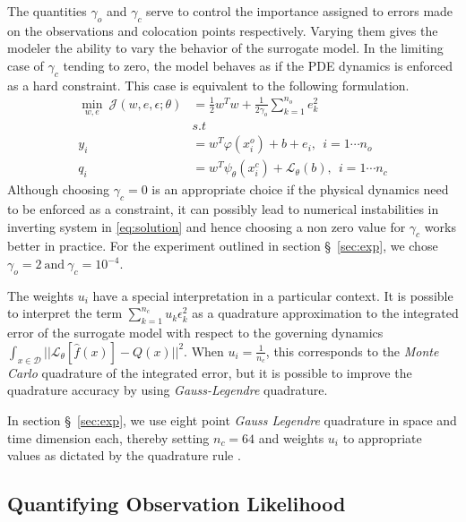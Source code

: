 The quantities $\gamma_o$ and $\gamma_c$ serve to control the importance assigned to errors made 
on the observations and colocation points respectively. Varying them gives the modeler the ability 
to vary the behavior of the surrogate model. In the limiting case of $\gamma_c$ tending to zero, 
the model behaves as if the PDE dynamics is enforced as a hard constraint. This case is equivalent 
to the following formulation.
%
\begin{equation}\label{eq:surrogate2}
   \begin{aligned}
    \min_{w,e} \ \mathcal{J}(w,e,\epsilon;\theta) &= 
    \frac{1}{2} w^{T}w + \frac{1}{2\gamma_{o}} \sum_{k = 1}^{n_{o}}{e^{2}_{k}} \\
    & s.t \\
    y_{i} & = w^{T}\varphi(x^{o}_{i}) + b + e_{i}, \ \ i = 1 \cdots n_{o} \\
    q_{i} & = w^{T}\psi_{\theta}(x^{c}_{i}) + \mathcal{L}_{\theta}(b), \ \ i = 1 \cdots n_{c}
   \end{aligned}
\end{equation}
%
Although choosing $\gamma_c = 0$ is an appropriate choice if the physical dynamics need to be 
enforced as a constraint, it can possibly lead to numerical instabilities in inverting system in 
\cref{eq:solution} and hence choosing a non zero value for $\gamma_c$ works better in practice. For 
the experiment outlined in section \S~\ref{sec:exp}, we chose 
$\gamma_o = 2 \ \text{and} \ \gamma_c = 10^{-4}$.

The weights $u_i$ have a special interpretation in a particular context. It is possible to
interpret the term $\sum_{k = 1}^{n_{c}}{u_{k} \epsilon^{2}_{k}}$ as a quadrature approximation
to the integrated error of the surrogate model with respect to the governing dynamics 
$\int_{x \in \mathcal{D}}{||\mathcal{L}_{\theta} [\hat{f}(x)] - Q(x)||^2}$. When 
$u_i = \frac{1}{n_c}$, this corresponds to the \emph{Monte Carlo} quadrature of the integrated 
error, but it is possible to improve the quadrature accuracy by using \emph{Gauss-Legendre} 
quadrature.

In section \S~\ref{sec:exp}, we use eight point \emph{Gauss Legendre} quadrature in space and time 
dimension each, thereby setting $n_c = 64$ and weights $u_i$ to appropriate values as dictated by 
the quadrature rule \citep{_abramowitzm}.

\subsection{Quantifying Observation Likelihood}

